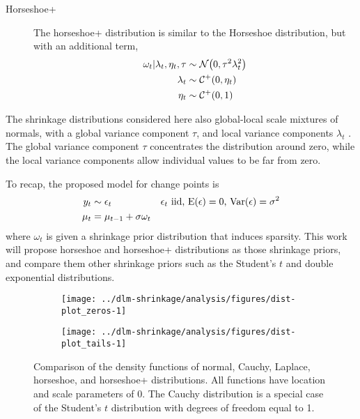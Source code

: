 \begin{description}
\item[Horseshoe+] The horseshoe+ distribution \textcite{BhadraDattaPolsonEtAl2015a} is similar to the Horseshoe distribution, but with an additional term,
\begin{equation}
  \label{dlm:eq:15}
  \begin{aligned}[t]
    \omega_{t} | \lambda_{t}, \eta_{t}, \tau & \sim \mathcal{N}\mathopen{}\left(0, \tau^{2} \lambda_{t}^{2}\right)\mathclose{} \\
    \lambda_{t}  & \sim \mathcal{C^+}\mathopen{}\left(0, \eta_{t}\right)\mathclose{} \\
    \eta_{t} & \sim \mathcal{C^+}\mathopen{}\left(0, 1\right)\mathclose{} \\
  \end{aligned}
\end{equation}
\end{description}

The shrinkage distributions considered here also global-local scale mixtures of normals, with a global variance component $\tau$, and local variance components $\lambda_{t}$ \parencite{PolsonScott2010}.
The global variance component $\tau$ concentrates the distribution around zero, while the local variance components allow individual values to be far from zero.

To recap, the proposed model for change points is
\begin{align}
  \label{dlm:eq:16}
  y_{t} & \sim \epsilon_{t} & \text{$\epsilon_{t}$ iid, $\operatorname{E}(\epsilon) = 0$, $\operatorname{Var}(\epsilon) = \sigma^{2}$} \\
  \mu_{t} &= \mu_{t - 1} + \sigma \omega_{t}
\end{align}
where $\omega_{t}$ is given a shrinkage prior distribution that induces sparsity.
This work will propose horseshoe and horseshoe+ distributions as those shrinkage priors, and compare them other shrinkage priors such as the Student's $t$ and double exponential distributions.


\begin{figure}[!htpb]
 \begin{subfigure}[b]{\linewidth}
  \texttt{[image: ../dlm-shrinkage/analysis/figures/dist-plot\_zeros-1]}
 \end{subfigure}
 \begin{subfigure}[b]{\linewidth}
    \texttt{[image: ../dlm-shrinkage/analysis/figures/dist-plot\_tails-1]}
 \end{subfigure}
  \caption{
    Comparison of the density functions of normal, Cauchy, Laplace, horseshoe, and horseshoe+ distributions.
    All functions have location and scale parameters of 0.
    The Cauchy distribution is a special case of the Student's $t$ distribution with degrees of freedom equal to 1.
  }
  \label{dlm:fig:density}
\end{figure}





